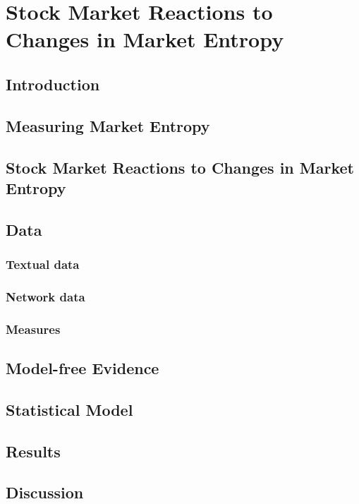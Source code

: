 \chapter{Stock Market Reactions to Changes in Market Entropy\label{ch:stock}}

\section{Introduction}
\section{Measuring Market Entropy}
\section{Stock Market Reactions to Changes in Market Entropy}
\section{Data}
\subsection{Textual data}
\subsection{Network data}
\subsection{Measures}
\section{Model-free Evidence}
\section{Statistical Model}
\section{Results}
\section{Discussion}
